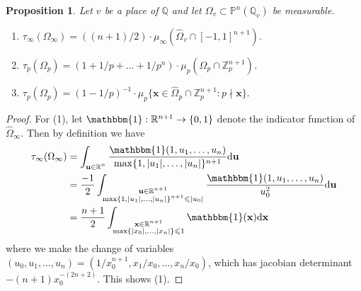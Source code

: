 \documentclass[a4paper,12pt,reqno]{amsart}
\numberwithin{equation}{section} \numberwithin{figure}{section}
\newcommand{\one}{\mathbbm{1}}
\newcommand{\x}{\mathbf{x}}
\renewcommand\P{\mathbb{P}}
\newcommand\Z{\mathbb{Z}}
\newcommand\Q{\mathbb{Q}}
\newcommand\R{\mathbb{R}}
\renewcommand{\leq}{\leqslant}
\renewcommand{\#}{\sharp}
\newtheorem{proposition}[lemma]{Proposition}
\theoremstyle{definition}
\numberwithin{lemma}{section}
\begin{document}
\begin{proposition}  \label{prop:local_densities}
	Let $v$ be a place of $\Q$ and let $\Omega_v \subset \P^n(\Q_v)$ be measurable.
	\begin{enumerate}
		\item $\tau_\infty(\Omega_\infty) = ((n+1)/2)\cdot \mu_\infty(\widehat{\Omega}_v \cap [-1,1]^{n+1}).$
		\item $\tau_p(\Omega_p) = (1 + 1/p + \dots + 1/p^n) \cdot \mu_p(\widehat{\Omega}_p \cap \Z_p^{n+1})$.	
		\item $\tau_p(\Omega_p) = (1-1/p)^{-1} \cdot \mu_p\{ \x \in \widehat{\Omega}_p \cap \Z_p^{n+1} : p \nmid \x\}.$
	\end{enumerate}
\end{proposition}
\begin{proof}
	For (1), let $\one: \R^{n+1} \to \{0,1\}$ denote the indicator function of $\widehat{\Omega}_\infty$. Then by definition we have
	\begin{align*}
	\tau_\infty(\Omega_\infty) & = \int_{\substack{\mathbf{u} \in \R^n  
	 }} \frac{\one(1,u_1,\dots,u_n) }{\max\{1, |u_1|, \dots, |u_n|\}^{n+1}} \mathrm{d} \mathbf{u} \\
	& = \frac{-1}{2}\int_{\substack{\mathbf{u} \in \R^{n+1} \\ \max\{1,|u_1|,\dots,|u_n|\}^{n+1} \leq |u_0| 
	 }} \frac{\one(1,u_1,\dots,u_n) }{u_0^2} \mathrm{d} \mathbf{u} \\
	& = \frac{n+1}{2}\int_{\substack{\x \in \R^{n+1} \\ \max\{|x_0|,\dots,|x_n|\} \leq 1 \\
	  }}  \one(\x) \mathrm{d} \x
	\end{align*}
	where we make the change of variables $(u_0,u_1,\dots,u_n) = (1/x_0^{n+1}, x_1/x_0,\dots,x_n/x_0)$,
	which has jacobian determinant $-(n+1)x_0^{-(2n + 2)}$. This shows (1).
	

\end{proof}
\end{document}
